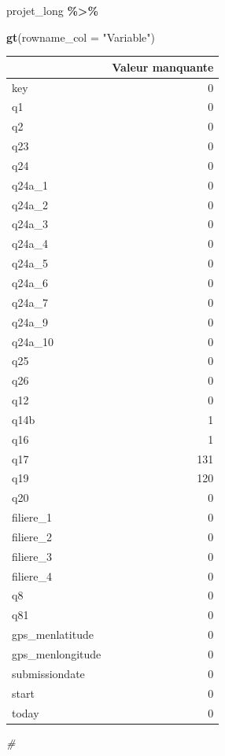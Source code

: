 \documentclass[
]{article}
\newenvironment{Shaded}{\begin{snugshade}}{\end{snugshade}}
\newcommand{\AttributeTok}[1]{\textcolor[rgb]{0.13,0.29,0.53}{#1}}
\newcommand{\CommentTok}[1]{\textcolor[rgb]{0.56,0.35,0.01}{\textit{#1}}}
\newcommand{\FunctionTok}[1]{\textcolor[rgb]{0.13,0.29,0.53}{\textbf{#1}}}
\newcommand{\NormalTok}[1]{#1}
\newcommand{\SpecialCharTok}[1]{\textcolor[rgb]{0.81,0.36,0.00}{\textbf{#1}}}
\newcommand{\StringTok}[1]{\textcolor[rgb]{0.31,0.60,0.02}{#1}}
\begin{document}
\begin{Shaded}
\begin{Highlighting}[]
\NormalTok{projet\_long }\SpecialCharTok{\%\textgreater{}\%}
  
  \FunctionTok{gt}\NormalTok{(}\AttributeTok{rowname\_col =} \StringTok{"Variable"}\NormalTok{)}
\end{Highlighting}
\end{Shaded}

\begin{longtable}{l|r}
\toprule
\multicolumn{1}{l}{} & Valeur manquante \\ 
\midrule
key & 0 \\ 
q1 & 0 \\ 
q2 & 0 \\ 
q23 & 0 \\ 
q24 & 0 \\ 
q24a\_1 & 0 \\ 
q24a\_2 & 0 \\ 
q24a\_3 & 0 \\ 
q24a\_4 & 0 \\ 
q24a\_5 & 0 \\ 
q24a\_6 & 0 \\ 
q24a\_7 & 0 \\ 
q24a\_9 & 0 \\ 
q24a\_10 & 0 \\ 
q25 & 0 \\ 
q26 & 0 \\ 
q12 & 0 \\ 
q14b & 1 \\ 
q16 & 1 \\ 
q17 & 131 \\ 
q19 & 120 \\ 
q20 & 0 \\ 
filiere\_1 & 0 \\ 
filiere\_2 & 0 \\ 
filiere\_3 & 0 \\ 
filiere\_4 & 0 \\ 
q8 & 0 \\ 
q81 & 0 \\ 
gps\_menlatitude & 0 \\ 
gps\_menlongitude & 0 \\ 
submissiondate & 0 \\ 
start & 0 \\ 
today & 0 \\ 
\bottomrule
\end{longtable}

\begin{Shaded}
\begin{Highlighting}[]
\CommentTok{\#}
\end{Highlighting}
\end{Shaded}
\end{document}
